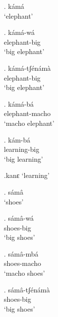 \documentclass{assets/fieldnotes}
\begin{document}

\ex. kámá\\
`elephant'

\ex. kámá-wá\\
elephant-big\\
`big elephant'

\ex. kámá-tʃénámà\\
elephant-big\\
`big elephant'

\ex. kámá-bá\\
elephant-macho\\
`macho elephant'

\ex. kám-bá\\
learning-big\\
`big learning'

\ex.kanɛ
`learning'

\ex. sámâ\\
`shoes'


\exg. sámâ-wá\\
shoes-big\\
`big shoes'

\exg. sámâ-mbá\\
shoes-macho\\
`macho shoes'

\exg. sámâ-tʃénámà\\
shoes-big\\
`big shoes'
\end{document}
